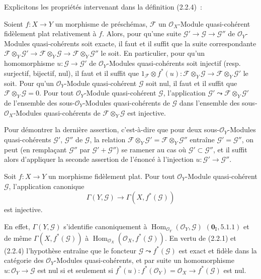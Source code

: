 Explicitons les propriétés intervenant dans la définition (2.2.4)~:

\begin{proposition}[2.2.7]
\label{IV.2.2.7-fr}
Soient $f:X\to Y$ un morphisme de préschémas, $\mathscr F$ un
$\mathcal O_X$-Module quasi-cohérent fidèlement plat relativement à $f$.
Alors, pour qu'une suite $\mathscr G'\to\mathscr G\to\mathscr G''$ de
$\mathcal O_Y$-Modules quasi-cohérents soit exacte, il faut et il suffit que
la suite correspondante
$\mathscr F\otimes_Y\mathscr G'\to\mathscr F\otimes_Y\mathscr G
\to\mathscr F\otimes_Y\mathscr G''$ le soit. En particulier, pour qu'un
homomorphisme $u:\mathscr G\to\mathscr G'$ de $\mathcal O_Y$-Modules
quasi-cohérents soit injectif \textup{(resp.} surjectif, bijectif, nul), il faut et il
suffit que $1_{\mathscr F}\otimes f^*(u):
\mathscr F\otimes_Y\mathscr G\to\mathscr F\otimes_Y\mathscr G'$ le soit.
Pour qu'un $\mathcal O_Y$-Module quasi-cohérent $\mathscr G$ soit nul, il faut
et il suffit que $\mathscr F\otimes_Y\mathscr G=0$. Pour tout
$\mathcal O_Y$-Module quasi-cohérent $\mathscr G$, l'application
$\mathscr G'\leadsto\mathscr F\otimes_Y\mathscr G'$ de l'ensemble des
sous-$\mathcal O_Y$-Modules quasi-cohérents de $\mathscr G$ dans l'ensemble
des sous-$\mathcal O_X$-Modules quasi-cohérents de
$\mathscr F\otimes_Y\mathscr G$ est injective.
\end{proposition}

Pour démontrer la dernière assertion, c'est-à-dire que pour deux
sous-$\mathcal O_Y$-Modules quasi-cohérents $\mathscr G'$, $\mathscr G''$ de
$\mathscr G$, la relation
$\mathscr F\otimes_Y\mathscr G'=\mathscr F\otimes_Y\mathscr G''$ entraîne
$\mathscr G'=\mathscr G''$, on peut (en remplaçant $\mathscr G''$ par
$\mathscr G'+\mathscr G''$) se ramener au cas où
$\mathscr G'\subset\mathscr G''$, et il suffit alors d'appliquer la seconde
assertion de l'énoncé à l'injection $u:\mathscr G'\to\mathscr G''$.

\begin{corollary}[2.2.8]
\label{IV.2.2.8-fr}
Soit $f:X\to Y$ un morphisme fidèlement plat. Pour tout
$\mathcal O_Y$-Module quasi-cohérent $\mathscr G$, l'application canonique
\begin{equation}
\tag{2.2.8.1}
\label{IV.2.2.8.1-fr}
\Gamma(Y,\mathscr G)\longrightarrow\Gamma(X,f^*(\mathscr G))
\end{equation}
est injective.
\end{corollary}

En effet, $\Gamma(Y,\mathscr G)$ s'identifie canoniquement à
$\operatorname{Hom}_{\mathcal O_Y}(\mathcal O_Y,\mathscr G)$
$(\mathbf{0}_{\mathrm I},5.1.1)$ et de même $\Gamma(X,f^*(\mathscr G))$ à
$\operatorname{Hom}_{\mathcal O_X}(\mathcal O_X,f^*(\mathscr G))$. En vertu
de (2.2.1) et (2.2.4) l'hypothèse entraîne que le foncteur
$\mathscr G\leadsto f^*(\mathscr G)$ est exact et fidèle dans la catégorie des
$\mathcal O_Y$-Modules quasi-cohérents, et par suite un homomorphisme
$u:\mathcal O_Y\to\mathscr G$ est nul si et seulement si
$f^*(u):f^*(\mathcal O_Y)=\mathcal O_X\to f^*(\mathscr G)$ est nul.

